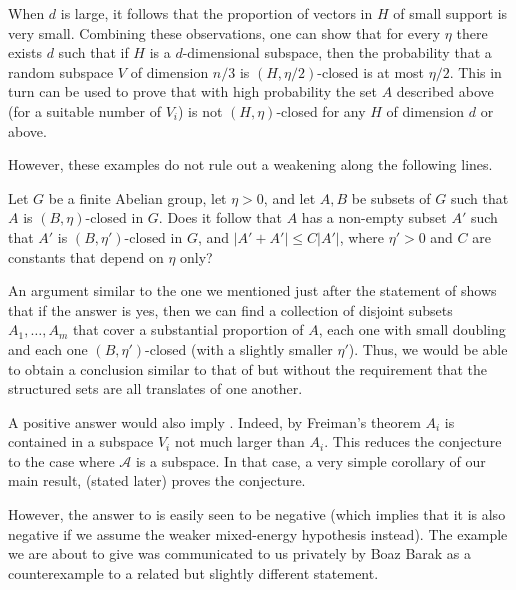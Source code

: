 \documentclass{toc}
\newcommand \cA{\mathcal A}
\begin{document}
When $d$ is large, it follows that the proportion of vectors in $H$ of small support is very small. Combining these observations, one can show that for every $\eta$ there exists $d$ such that if $H$ is a $d$-dimensional subspace, then the probability that a random subspace $V$ of dimension $n/3$ is $(H,\eta/2)$-closed is at most $\eta/2$. This in turn can be used to prove that with high probability the set $A$ described above (for a suitable number of $V_i$) is not $(H,\eta)$-closed for any $H$ of dimension $d$ or above.

However, these examples do not rule out a weakening along the following lines.

\begin{question}\label{wrongq}
	Let $G$ be a finite Abelian group, let $\eta>0$, and let $A,B$ be subsets of $G$ such that $A$ is $(B,\eta)$-closed in $G$. Does it follow that $A$ has a non-empty subset $A'$ such that $A'$ is $(B,\eta')$-closed in $G$, and $|A'+A'|\leq C|A'|$, where $\eta'>0$ and $C$ are constants that depend on $\eta$ only?
\end{question}

\noindent An argument similar to the one we mentioned just after the statement of  shows that if the answer is yes, then we can find a collection of disjoint subsets $A_1,\dots,A_m$ that cover a substantial proportion of $A$, each one with small doubling and each one $(B,\eta')$-closed (with a slightly smaller $\eta'$). Thus, we would be able to obtain a conclusion similar to that of  but without the requirement that the structured sets are all translates of one another.

A positive answer would also imply . Indeed, by Freiman's theorem $A_i$ is contained in a subspace $V_i$ not much larger than $A_i$. This reduces the conjecture to the case where $\cA$ is a subspace. In that case, a very simple corollary of our main result,  (stated later) proves the conjecture.

However, the answer to  is easily seen to be negative (which implies that it is also negative if we assume the weaker mixed-energy hypothesis instead). The example we are about to give was communicated to us privately by Boaz Barak as a counterexample to a related but slightly different statement. 
\end{document}
